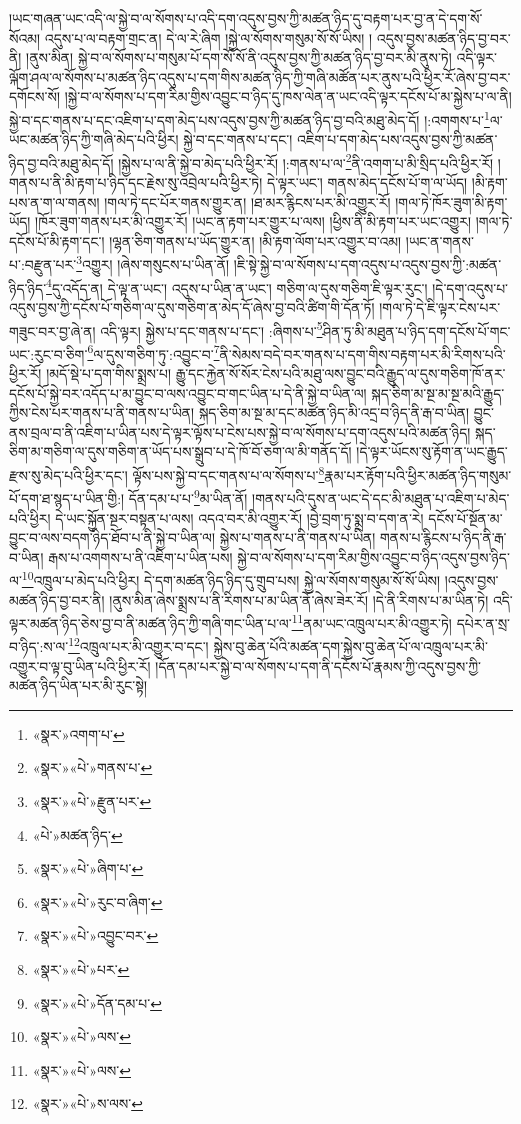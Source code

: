 །ཡང་གཞན་ཡང་འདི་ལ་སྐྱེ་བ་ལ་སོགས་པ་འདི་དག་འདུས་བྱས་ཀྱི་མཚན་ཉིད་དུ་བརྟག་པར་བྱ་ན་དེ་དག་སོ་སོའམ། འདུས་པ་ལ་བརྟག་གྲང་ན། དེ་ལ་རེ་ཞིག །སྐྱེ་ལ་སོགས་གསུམ་སོ་སོ་ཡིས། །
འདུས་བྱས་མཚན་ཉིད་བྱ་བར་ནི། །ནུས་མིན། སྐྱེ་བ་ལ་སོགས་པ་གསུམ་པོ་དག་སོ་སོ་ནི་འདུས་བྱས་ཀྱི་མཚན་ཉིད་བྱ་བར་མི་ནུས་ཏེ། འདི་ལྟར་ལྐོག་ཤལ་ལ་སོགས་པ་མཚན་ཉིད་འདུས་པ་དག་གིས་མཚན་ཉིད་ཀྱི་གཞི་མཚོན་པར་ནུས་པའི་ཕྱིར་རོ་ཞེས་བྱ་བར་དགོངས་སོ། །སྐྱེ་བ་ལ་སོགས་པ་དག་རིམ་གྱིས་འབྱུང་བ་ཉིད་དུ་ཁས་ལེན་ན་ཡང་འདི་ལྟར་དངོས་པོ་མ་སྐྱེས་པ་ལ་ནི། སྐྱེ་བ་དང་གནས་པ་དང་འཇིག་པ་དག་མེད་པས་འདུས་བྱས་ཀྱི་མཚན་ཉིད་བྱ་བའི་མཐུ་མེད་དོ། །:འགགས་པ་\footnote{«སྣར་»འགག་པ་}ལ་ཡང་མཚན་ཉིད་ཀྱི་གཞི་མེད་པའི་ཕྱིར། སྐྱེ་བ་དང་གནས་པ་དང་། འཇིག་པ་དག་མེད་པས་འདུས་བྱས་ཀྱི་མཚན་ཉིད་བྱ་བའི་མཐུ་མེད་དོ། །སྐྱེས་པ་ལ་ནི་སྐྱེ་བ་མེད་པའི་ཕྱིར་རོ། །:གནས་པ་ལ་\footnote{«སྣར་»«པེ་»གནས་པ་}ནི་འགག་པ་མི་སྲིད་པའི་ཕྱིར་རོ། །གནས་པ་ནི་མི་རྟག་པ་ཉིད་དང་རྗེས་སུ་འབྲེལ་པའི་ཕྱིར་ཏེ། དེ་ལྟར་ཡང་། གནས་མེད་དངོས་པོ་ག་ལ་ཡོད། །མི་རྟག་པས་ན་ག་ལ་གནས། །གལ་ཏེ་དང་པོར་གནས་གྱུར་ན། །ཐ་མར་རྙིངས་པར་མི་འགྱུར་རོ། །གལ་ཏེ་ཁོར་ཟུག་མི་རྟག་ཡོད། །ཁོར་ཟུག་གནས་པར་མི་འགྱུར་རོ། །ཡང་ན་རྟག་པར་གྱུར་པ་ལས། །ཕྱིས་ནི་མི་རྟག་པར་ཡང་འགྱུར། །གལ་ཏེ་དངོས་པོ་མི་རྟག་དང་། །ལྷན་ཅིག་གནས་པ་ཡོད་གྱུར་ན། །མི་རྟག་ལོག་པར་འགྱུར་བ་འམ། །ཡང་ན་གནས་པ་:བརྫུན་པར་\footnote{«སྣར་»«པེ་»རྫུན་པར་}འགྱུར། །ཞེས་གསུངས་པ་ཡིན་ནོ། །ཇི་སྟེ་སྐྱེ་བ་ལ་སོགས་པ་དག་འདུས་པ་འདུས་བྱས་ཀྱི་:མཚན་ཉིད་ཉིད་\footnote{«པེ་»མཚན་ཉིད་}དུ་འདོད་ན། དེ་ལྟ་ན་ཡང་། འདུས་པ་ཡིན་ན་ཡང་། གཅིག་ལ་དུས་གཅིག་ཇི་ལྟར་རུང་། །དེ་དག་འདུས་པ་འདུས་བྱས་ཀྱི་དངོས་པོ་གཅིག་ལ་དུས་གཅིག་ན་མེད་དོ་ཞེས་བྱ་བའི་ཚིག་གི་དོན་ཏོ། །གལ་ཏེ་དེ་ཇི་ལྟར་ངེས་པར་གཟུང་བར་བྱ་ཞེ་ན། འདི་ལྟར། སྐྱེས་པ་དང་གནས་པ་དང་། :ཞིགས་པ་\footnote{«སྣར་»«པེ་»ཞིག་པ་}ཤིན་ཏུ་མི་མཐུན་པ་ཉིད་དག་དངོས་པོ་གང་ཡང་:རུང་བ་ཅིག་\footnote{«སྣར་»«པེ་»རུང་བ་ཞིག་}ལ་དུས་གཅིག་ཏུ་:འབྱུང་བ་\footnote{«སྣར་»«པེ་»འབྱུང་བར་}ནི་སེམས་བདེ་བར་གནས་པ་དག་གིས་བརྟག་པར་མི་རིགས་པའི་ཕྱིར་རོ། །མདོ་སྡེ་པ་དག་གིས་སྨྲས་པ། རྒྱུ་དང་རྐྱེན་སོ་སོར་ངེས་པའི་མཐུ་ལས་བྱུང་བའི་རྒྱུད་ལ་དུས་གཅིག་ཁོ་ནར་དངོས་པོ་སྐྱེ་བར་འདོད་པ་མ་བྱུང་བ་ལས་འབྱུང་བ་གང་ཡིན་པ་དེ་ནི་སྐྱེ་བ་ཡིན་ལ། སྐད་ཅིག་མ་སྔ་མ་སྔ་མའི་རྒྱུད་ཀྱིས་ངེས་པར་གནས་པ་ནི་གནས་པ་ཡིན། སྐད་ཅིག་མ་སྔ་མ་དང་མཚན་ཉིད་མི་འདྲ་བ་ཉིད་ནི་རྒ་བ་ཡིན། བྱུང་ནས་བྲལ་བ་ནི་འཇིག་པ་ཡིན་པས་དེ་ལྟར་ལྟོས་པ་ངེས་པས་སྐྱེ་བ་ལ་སོགས་པ་དག་འདུས་པའི་མཚན་ཉིད། སྐད་ཅིག་མ་གཅིག་ལ་དུས་གཅིག་ན་ཡོད་པས་སྒྲུབ་པ་དེ་ཁོ་བོ་ཅག་ལ་མི་གནོད་དོ། །དེ་ལྟར་ཡོངས་སུ་རྟོག་ན་ཡང་རྒྱུད་རྫས་སུ་མེད་པའི་ཕྱིར་དང་། ལྟོས་པས་སྐྱེ་བ་དང་གནས་པ་ལ་སོགས་པ་\footnote{«སྣར་»«པེ་»པར་}རྣམ་པར་རྟོག་པའི་ཕྱིར་མཚན་ཉིད་གསུམ་པོ་དག་ཐ་སྙད་པ་ཡིན་གྱི:། དོན་དམ་པ་པ་\footnote{«སྣར་»«པེ་»དོན་དམ་པ་}མ་ཡིན་ནོ། །གནས་པའི་དུས་ན་ཡང་དེ་དང་མི་མཐུན་པ་འཇིག་པ་མེད་པའི་ཕྱིར། དེ་ཡང་སྐྱོན་སྔར་བསྟན་པ་ལས། འདའ་བར་མི་འགྱུར་རོ། །བྱེ་བྲག་ཏུ་སྨྲ་བ་དག་ན་རེ། དངོས་པོ་སྔོན་མ་བྱུང་བ་ལས་བདག་ཉིད་ཐོབ་པ་ནི་སྐྱེ་བ་ཡིན་ལ། སྐྱེས་པ་གནས་པ་ནི་གནས་པ་ཡིན། གནས་པ་རྙིངས་པ་ཉིད་ནི་རྒ་བ་ཡིན། རྒས་པ་འགགས་པ་ནི་འཇིག་པ་ཡིན་པས། སྐྱེ་བ་ལ་སོགས་པ་དག་རིམ་གྱིས་འབྱུང་བ་ཉིད་འདུས་བྱས་ཉིད་ལ་\footnote{«སྣར་»«པེ་»ལས་}འཁྲུལ་པ་མེད་པའི་ཕྱིར། དེ་དག་མཚན་ཉིད་ཉིད་དུ་གྲུབ་པས། སྐྱེ་ལ་སོགས་གསུམ་སོ་སོ་ཡིས། །འདུས་བྱས་མཚན་ཉིད་བྱ་བར་ནི། །ནུས་མིན་ཞེས་སྨྲས་པ་ནི་རིགས་པ་མ་ཡིན་ནོ་ཞེས་ཟེར་རོ། །དེ་ནི་རིགས་པ་མ་ཡིན་ཏེ། འདི་ལྟར་མཚན་ཉིད་ཅེས་བྱ་བ་ནི་མཚན་ཉིད་ཀྱི་གཞི་གང་ཡིན་པ་ལ་\footnote{«སྣར་»«པེ་»ལས་}ནམ་ཡང་འཁྲུལ་པར་མི་འགྱུར་ཏེ། དཔེར་ན་སྲ་བ་ཉིད་:ས་ལ་\footnote{«སྣར་»«པེ་»ས་ལས་}འཁྲུལ་པར་མི་འགྱུར་བ་དང་། སྐྱེས་བུ་ཆེན་པོའི་མཚན་དག་སྐྱེས་བུ་ཆེན་པོ་ལ་འཁྲུལ་པར་མི་འགྱུར་བ་ལྟ་བུ་ཡིན་པའི་ཕྱིར་རོ། །དོན་དམ་པར་སྐྱེ་བ་ལ་སོགས་པ་དག་ནི་དངོས་པོ་རྣམས་ཀྱི་འདུས་བྱས་ཀྱི་མཚན་ཉིད་ཡིན་པར་མི་རུང་སྟེ། 